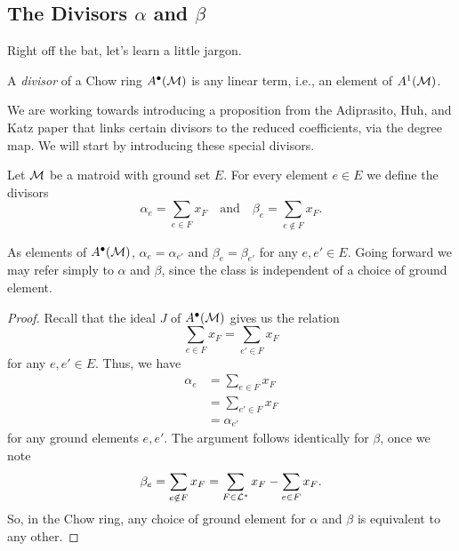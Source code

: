 \documentclass[12pt,oneside]{../../sfsuthesis}
\begin{document}
\subsection{The Divisors \texorpdfstring{\( \alpha \)}{alpha} and \texorpdfstring{\( \beta \)}{beta}}
Right off the bat, let's learn a little jargon.
\begin{definition}[Divisor]
    A \emph{divisor} of a Chow ring \( A^\bullet(\mathcal{M}) \) is any linear term, i.e., an element of \( A^1(\mathcal{M}) \).
\end{definition}
We are working towards introducing a proposition from the Adiprasito, Huh, and Katz paper that links certain divisors to the reduced coefficients, via the degree map.
We will start by introducing these special divisors.
\begin{definition}\label{def:alphaBeta}
    Let \( \mathcal{M} \) be a matroid with ground set \( E \).
    For every element \( e \in E \) we define the divisors
    \[
        \alpha_e = \sum_{e \in F} x_F \quad \text{and} \quad \beta_e = \sum_{e \notin F}x_F.
    \]
\end{definition}
\begin{proposition}
    As elements of \( A^\bullet(\mathcal{M}) \), \(\alpha_{e} = \alpha_{e'} \) and \(\beta_{e} = \beta_{e'} \) for any \( e, e' \in E \).
    Going forward we may refer simply to \( \alpha \) and \( \beta \), since the class is independent of a choice of ground element.
\end{proposition}
\begin{proof}
    Recall that the ideal \( J \) of \( A^\bullet(\mathcal{M}) \) gives us the relation
    \[
        \sum_{e \in F} x_F = \sum_{e' \in F} x_F
    \]
    for any \( e, e' \in E \).
    Thus, we have
    \begin{align*}
        \alpha_{e} & = \sum_{e \in F} x_F  \\
                   & = \sum_{e' \in F} x_F \\
                   & = \alpha_{e'}
    \end{align*}
    for any ground elements \( e, e' \).
    The argument follows identically for \( \beta \), once we note
    \[
        \beta_e =  \sum_{e \notin F} x_F = \sum_{F \in \mathcal{L}^\ast} x_F - \sum_{e \in F} x_F.
    \]
    So, in the Chow ring, any choice of ground element for \( \alpha \) and \( \beta \) is equivalent to any other.
\end{proof}
\end{document}
